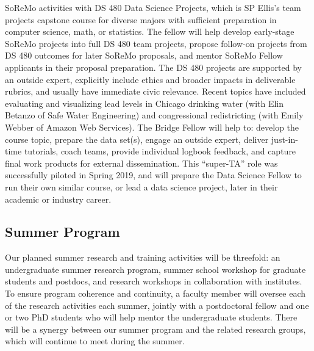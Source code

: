 \documentclass[11pt]{NSFamsart}
\begin{document}
SoReMo activities with DS 480 Data Science Projects, which is SP Ellis’s team projects capstone course for diverse majors with sufficient preparation in computer science, math, or statistics.  The fellow will help develop early-stage SoReMo projects into full DS 480 team projects, propose follow-on projects from DS 480 outcomes for later SoReMo proposals, and mentor SoReMo Fellow applicants in their proposal preparation.  The DS 480 projects are supported by an outside expert, explicitly include ethics and broader impacts in deliverable rubrics, and usually have immediate civic relevance.  Recent topics have included evaluating and visualizing lead levels in Chicago drinking water (with Elin Betanzo of Safe Water Engineering) and congressional redistricting (with Emily Webber of Amazon Web Services).  The Bridge Fellow will help to: develop the course topic, prepare the data set(s), engage an outside expert, deliver just-in-time tutorials, coach teams, provide individual logbook feedback, and capture final work products for external dissemination.  This “super-TA” role was successfully piloted in Spring 2019, and will prepare the Data Science Fellow to run their own similar course, or lead a data science project, later in their academic or industry career.  





\subsection{Summer Program}    \label{sec:summer}

Our planned summer research and training activities will be threefold: an undergraduate summer research program, summer school workshop for graduate students and postdocs, and research workshops in collaboration with institutes. To ensure program coherence and continuity, a faculty member will oversee each of the research activities each summer, jointly with a postdoctoral fellow and one or two PhD students who will help mentor the undergraduate students.  There will be a synergy between our summer program and the related research groups, which will continue to meet during the summer. 
\end{document}
